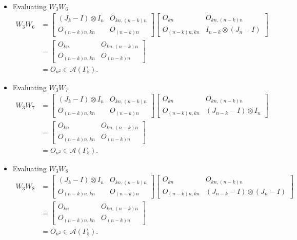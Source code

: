 \begin{itemize}
\item Evaluating $W_{3}W_{6}$
\begin{align*}
W_3W_6 &=
\begin{bmatrix}
(J_k - I) \otimes I_n & O_{kn, (n-k)n} \\
O_{(n-k)n,kn} & O_{(n-k)n}
\end{bmatrix}
\begin{bmatrix}
O_{kn} & O_{kn, (n-k)n} \\
O_{(n-k)n,kn} & I_{n-k}\otimes (J_n-I)
\end{bmatrix}\\
&= \begin{bmatrix}
O_{kn} & O_{kn, (n-k)n} \\
O_{(n-k)n,kn} & O_{(n - k)n}
\end{bmatrix}\\
&= O_{n^2} \in\mathcal{A}(\Gamma_5).
\end{align*}

\item Evaluating $W_{3}W_{7}$
\begin{align*}
W_3W_7 &=
\begin{bmatrix}
(J_k - I) \otimes I_n & O_{kn, (n-k)n} \\
O_{(n-k)n,kn} & O_{(n-k)n}
\end{bmatrix}
\begin{bmatrix}
O_{kn} & O_{kn, (n-k)n} \\
O_{(n-k)n,kn} & (J_{n-k}-I) \otimes I_n
\end{bmatrix}\\
&= \begin{bmatrix}
O_{kn} & O_{kn, (n-k)n} \\
O_{(n-k)n,kn} & O_{(n - k)n}
\end{bmatrix}\\
&= O_{n^2} \in\mathcal{A}(\Gamma_5).
\end{align*}

\item Evaluating $W_{3}W_{8}$
\begin{align*}
W_3W_8 &=
\begin{bmatrix}
(J_k - I) \otimes I_n & O_{kn, (n-k)n} \\
O_{(n-k)n,kn} & O_{(n-k)n}
\end{bmatrix}
\begin{bmatrix}
O_{kn} & O_{kn, (n-k)n} \\
O_{(n-k)n,kn} & (J_{n-k}-I)\otimes (J_n-I)
\end{bmatrix}\\
&= \begin{bmatrix}
O_{kn} & O_{kn, (n-k)n} \\
O_{(n-k)n,kn} & O_{(n - k)n}
\end{bmatrix}\\
&= O_{n^2} \in\mathcal{A}(\Gamma_5).
\end{align*}


\end{itemize}
